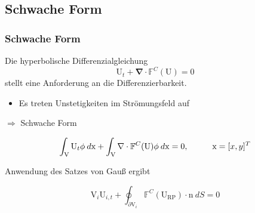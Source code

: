\documentclass[
	11pt, %
	aspectratio=169, %
]{beamer}
\begin{document}

\subsection{Schwache Form}

\begin{frame}

	\frametitle{Schwache Form}

	Die hyperbolische Differenzialgleichung
	\begin{equation}
		\mathrm{U}_t + \mathbf{\nabla} \cdot \mathbb{F}^C (\mathrm{U}) = 0
	\end{equation}
	stellt eine Anforderung an die Differenzierbarkeit. 
	 \begin{itemize}
	 	\item Es treten Unstetigkeiten im Strömungsfeld auf
	 \end{itemize}
	
	\hspace*{1cm}$\Rightarrow$ Schwache Form

	\begin{equation}
		\int_\mathrm{V}{\mathrm{U}_t \phi \: d\mathrm{x}}+\int_{\mathrm{V}}{\nabla \cdot \mathbb{F}^C (\mathrm{U}) \phi \: d\mathrm{x} }=0, \hspace*{1cm} \mathrm{x} = [x,y]^T
	\end{equation}

	Anwendung des Satzes von Gauß ergibt

	\begin{equation}
		\mathrm{V}_i \mathrm{U}_{i,t} + \oint_{\partial \mathrm{V}_i}{\mathbb{F}^C (\mathrm{U_{RP}})\cdot \mathrm{n} \: dS}=0
	\end{equation}



	
	
	

\end{frame}
\end{document}

